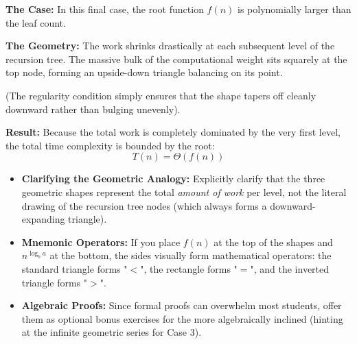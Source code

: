 \documentclass[11pt, a4paper]{article}
\begin{document}
\textbf{The Case:} In this final case, the root function $f(n)$ is polynomially larger than the leaf count.

\textbf{The Geometry:}  The work shrinks drastically at each subsequent level of the recursion tree. The massive bulk of the computational weight sits squarely at the top node, forming an upside-down triangle balancing on its point. 

(The regularity condition simply ensures that the shape tapers off cleanly downward rather than bulging unevenly).

\textbf{Result:} Because the total work is completely dominated by the very first level, the total time complexity is bounded by the root:
\begin{equation*}
    T(n) = \Theta(f(n))
\end{equation*}

\vspace{0.5cm}
\begin{center}
\end{center}

\vspace{1cm}
\begin{educatortip}
\begin{itemize}
    \item \textbf{Clarifying the Geometric Analogy:} Explicitly clarify that the three geometric shapes represent the total \textit{amount of work} per level, not the literal drawing of the recursion tree nodes (which always forms a downward-expanding triangle).
    \item \textbf{Mnemonic Operators:} If you place $f(n)$ at the top of the shapes and $n^{\log_b a}$ at the bottom, the sides visually form mathematical operators: the standard triangle forms "$<$", the rectangle forms "$=$", and the inverted triangle forms "$>$".
    \item \textbf{Algebraic Proofs:} Since formal proofs can overwhelm most students, offer them as optional bonus exercises for the more algebraically inclined (hinting at the infinite geometric series for Case 3).
\end{itemize}
\end{educatortip}
\end{document}
